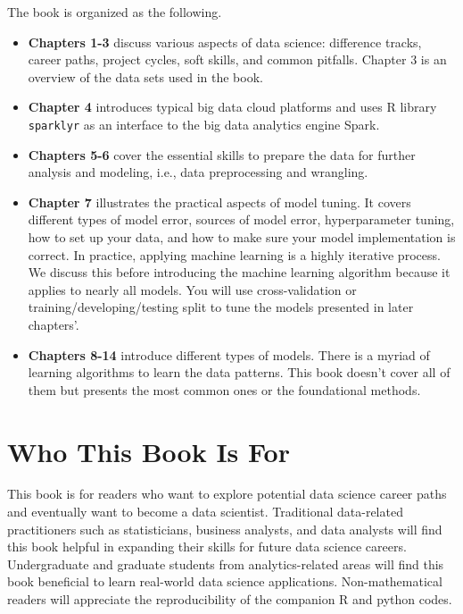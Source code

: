 \documentclass[12pt,]{krantz}
\providecommand{\tightlist}{%
  \setlength{\itemsep}{0pt}\setlength{\parskip}{0pt}}
\begin{document}
The book is organized as the following.

\begin{itemize}
\tightlist
\item
  \textbf{Chapters 1-3} discuss various aspects of data science: difference tracks, career paths, project cycles, soft skills, and common pitfalls. Chapter 3 is an overview of the data sets used in the book.
\item
  \textbf{Chapter 4} introduces typical big data cloud platforms and uses R library \texttt{sparklyr}  as an interface to the big data analytics engine Spark.
\item
  \textbf{Chapters 5-6} cover the essential skills to prepare the data for further analysis and modeling, i.e., data preprocessing and wrangling.
\item
  \textbf{Chapter 7} illustrates the practical aspects of model tuning. It covers different types of model error, sources of model error, hyperparameter tuning, how to set up your data, and how to make sure your model implementation is correct. In practice, applying machine learning is a highly iterative process. We discuss this before introducing the machine learning algorithm because it applies to nearly all models. You will use cross-validation or training/developing/testing split to tune the models presented in later chapters'.
\item
  \textbf{Chapters 8-14} introduce different types of models. There is a myriad of learning algorithms to learn the data patterns. This book doesn't cover all of them but presents the most common ones or the foundational methods.
\end{itemize}

\hypertarget{who-this-book-is-for}{%
\section*{Who This Book Is For}\label{who-this-book-is-for}}


This book is for readers who want to explore potential data science career paths and eventually want to become a data scientist. Traditional data-related practitioners such as statisticians, business analysts, and data analysts will find this book helpful in expanding their skills for future data science careers. Undergraduate and graduate students from analytics-related areas will find this book beneficial to learn real-world data science applications. Non-mathematical readers will appreciate the reproducibility of the companion R and python codes.
\end{document}
